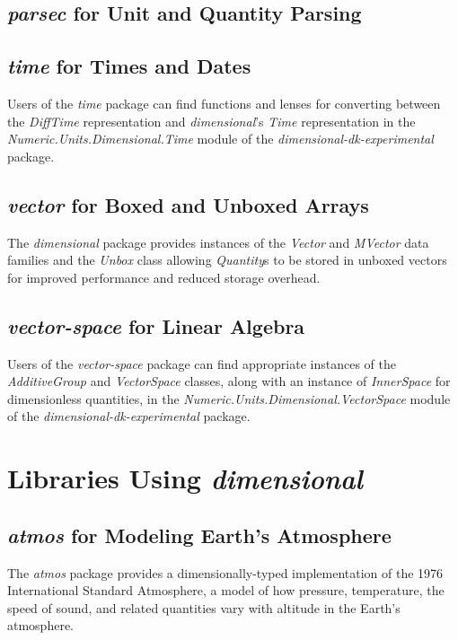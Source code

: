 \documentclass[12pt]{report}
\newcommand{\packagename}[1]{\textit{#1}}
\newcommand{\thispackage}{\packagename{dimensional}}
\newcommand{\experimentalpackage}{\packagename{dimensional-dk-experimental}}
\newcommand{\classname}[1]{\textit{#1}}
\newcommand{\typename}[1]{\textit{#1}}
\newcommand{\modulename}[1]{\textit{#1}}
\newcommand{\submodule}[1]{\modulename{Numeric.Units.Dimensional.{#1}}}
\begin{document}
\section{\packagename{parsec} for Unit and Quantity Parsing}
\section{\packagename{time} for Times and Dates}

Users of the \packagename{time} package can find functions and lenses for converting
between the \typename{DiffTime} representation and \thispackage{}'s \typename{Time} representation in the
\submodule{Time} module of the \experimentalpackage{} package.

\section{\packagename{vector} for Boxed and Unboxed Arrays}

The \thispackage{} package provides instances of the \typename{Vector} and \typename{MVector} data families and the \classname{Unbox} class
allowing \typename{Quantity}s to be stored in unboxed vectors for improved performance and reduced storage overhead.

\section{\packagename{vector-space} for Linear Algebra}

Users of the \packagename{vector-space} package can find appropriate instances of
the \classname{AdditiveGroup} and \classname{VectorSpace} classes, along with an
instance of \classname{InnerSpace} for dimensionless quantities, in the
\submodule{VectorSpace} module of the \experimentalpackage{} package.

\chapter{Libraries Using \thispackage}

\section{\packagename{atmos} for Modeling Earth's Atmosphere}

The \packagename{atmos} package provides a dimensionally-typed implementation of the 1976 International Standard
Atmosphere, a model of how pressure, temperature, the speed of sound, and related quantities vary with
altitude in the Earth's atmosphere.
\end{document}
